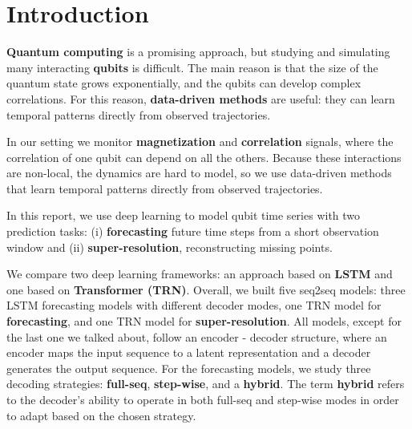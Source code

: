 \section{Introduction}
\label{sec:intro}

\textbf{Quantum computing} is a promising approach, but studying and simulating many interacting \textbf{qubits} is difficult. The main reason is that the size of the quantum state grows exponentially, and the qubits can develop complex correlations. For this reason, \textbf{data-driven methods} are useful: they can learn temporal patterns directly from observed trajectories.


In our setting we monitor \textbf{magnetization} and \textbf{correlation} signals, where the correlation of one qubit can depend on all the others. Because these interactions are non-local, the dynamics are hard to model, so we use data-driven methods that learn temporal patterns directly from observed trajectories.


In this report, we use deep learning to model qubit time series with two prediction tasks: (i) \textbf{forecasting} future time steps from a short observation window and (ii) \textbf{super-resolution}, reconstructing missing points.

We compare two deep learning frameworks: an approach based on \textbf{LSTM} and one based on \textbf{Transformer (TRN)}. Overall, we built five seq2seq models: three LSTM forecasting models with different decoder modes, one TRN model for \textbf{forecasting}, and one TRN model for \textbf{super-resolution}. All models, except for the last one we talked about, follow an encoder - decoder structure, where an encoder maps the input sequence to a latent representation and a decoder generates the output sequence. For the forecasting models, we study three decoding strategies: \textbf{full-seq}, \textbf{step-wise}, and a \textbf{hybrid}. The term \textbf{hybrid} refers to the decoder's ability to operate in both full-seq and step-wise modes in order to adapt based on the chosen strategy.
